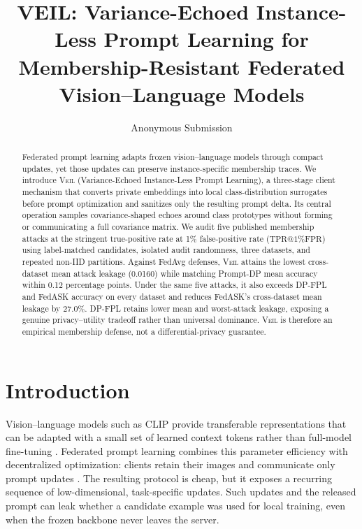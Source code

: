 \documentclass[letterpaper]{article}
\title{VEIL: Variance-Echoed Instance-Less Prompt Learning for Membership-Resistant Federated Vision--Language Models}
\author{Anonymous Submission}
\makeatletter
\newcommand{\method}{\textsc{Veil}}
\newcommand{\tpr}{\ensuremath{\mathrm{TPR}@1\%\mathrm{FPR}}}
\makeatother
\begin{document}
\maketitle

\begin{abstract}
Federated prompt learning adapts frozen vision--language models through compact
updates, yet those updates can preserve instance-specific membership traces.
We introduce \method{} (Variance-Echoed Instance-Less Prompt Learning), a
three-stage client mechanism that converts private embeddings into local
class-distribution surrogates before prompt optimization and sanitizes only the
resulting prompt delta.  Its central operation samples covariance-shaped echoes
around class prototypes without forming or communicating a full covariance
matrix.  We audit five published membership attacks at the stringent
true-positive rate at 1\% false-positive rate (\tpr{}) using label-matched
candidates, isolated audit randomness, three datasets, and repeated non-IID
partitions.  Against FedAvg defenses, \method{} attains the lowest cross-dataset
mean attack leakage (0.0160) while matching Prompt-DP mean accuracy within 0.12
percentage points.  Under the same five attacks, it also exceeds DP-FPL and
FedASK accuracy on every dataset and reduces FedASK's cross-dataset mean leakage
by 27.0\%.  DP-FPL retains lower mean and worst-attack leakage, exposing a
genuine privacy--utility tradeoff rather than universal dominance.  \method{}
is therefore an empirical membership defense, not a differential-privacy
guarantee.
\end{abstract}

\section{Introduction}

Vision--language models such as CLIP provide transferable representations that
can be adapted with a small set of learned context tokens rather than full-model
fine-tuning \citep{radford2021clip,zhou2022coop}.  Federated prompt learning
combines this parameter efficiency with decentralized optimization: clients
retain their images and communicate only prompt updates
\citep{mcmahan2017fedavg,zhao2023fedprompt,guo2024promptfl}.  The resulting protocol is cheap,
but it exposes a recurring sequence of low-dimensional, task-specific updates.
Such updates and the released prompt can leak whether a candidate example was
used for local training, even when the frozen backbone never leaves the server.
\end{document}
